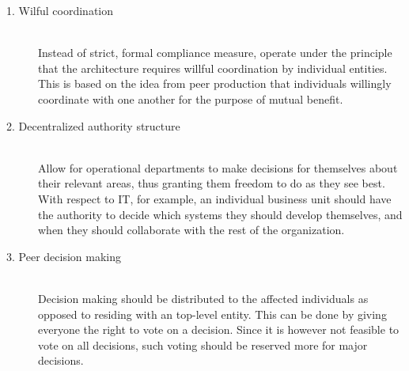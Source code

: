 \begin{description}
\item[1. Wilful coordination] \hfill \\ Instead of strict, formal compliance measure, operate under the principle that the architecture requires willful coordination by individual entities. This is based on the idea from peer production that individuals willingly coordinate with one another for the purpose of mutual benefit.

\item[2. Decentralized authority structure] \hfill \\ Allow for operational departments to make decisions for themselves about their relevant areas, thus granting them freedom to do as they see best. With respect to IT, for example, an individual business unit should have the authority to decide which systems they should develop themselves, and when they should collaborate with the rest of the organization. 

\item[3. Peer decision making] \hfill \\ Decision making should be distributed to the affected individuals as opposed to residing with an top-level entity. This can be done by giving everyone the right to vote on a decision. Since it is however not feasible to vote on all decisions, such voting should be reserved more for major decisions. 
\end{description}



